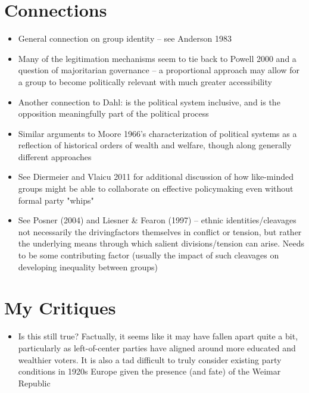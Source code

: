 \documentclass[12pt]{article}
\begin{document}
\section{Connections}

\begin{itemize}
    \item General connection on group identity -- see Anderson 1983
    \item Many of the legitimation mechanisms seem to tie back to Powell 2000 and a question of majoritarian governance -- a proportional approach may allow for a group to become politically relevant with much greater accessibility
    \item Another connection to Dahl: is the political system inclusive, and is the opposition meaningfully part of the political process
    \item Similar arguments to Moore 1966's characterization of political systems as a reflection of historical orders of wealth and welfare, though along generally different approaches
    \item See Diermeier and Vlaicu 2011 for additional discussion of how like-minded groups might be able to collaborate on effective policymaking even without formal party "whips"
    \item See Posner (2004) and Liesner \& Fearon (1997) -- ethnic identities/cleavages not necessarily the drivingfactors themselves in conflict or tension, but rather the underlying means through which salient divisions/tension can arise. Needs to be some contributing factor (usually the impact of such cleavages on developing inequality between groups)
\end{itemize}


\section{My Critiques}

\begin{itemize}
    \item Is this still true? Factually, it seems like it may have fallen apart quite a bit, particularly as left-of-center parties have aligned around more educated and wealthier voters. It is also a tad difficult to truly consider existing party conditions in 1920s Europe given the presence (and fate) of the Weimar Republic
\end{itemize}
\end{document}
